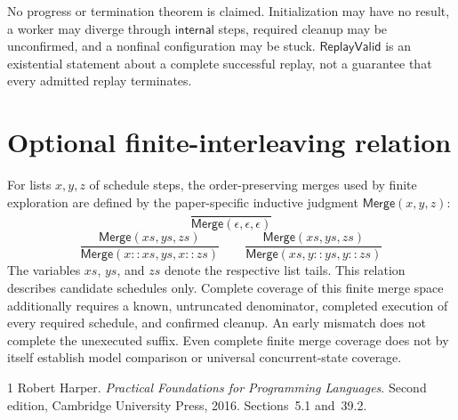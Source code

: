 \documentclass{article}
\newcommand{\Internal}{\mathsf{internal}}
\newcommand{\ReplayValid}{\mathsf{ReplayValid}}
\newcommand{\Merge}{\mathsf{Merge}}
\begin{document}
No progress or termination theorem is claimed. Initialization may have no
result, a worker may diverge through $\Internal$ steps, required cleanup may
be unconfirmed, and a nonfinal configuration may be stuck. $\ReplayValid$ is
an existential statement about a complete successful replay, not a guarantee
that every admitted replay terminates.

\section{Optional finite-interleaving relation}

For lists $x,y,z$ of schedule steps, the order-preserving merges used by finite
exploration are defined by the paper-specific inductive judgment
$\Merge(x,y,z)$:
\[
\frac{}{\Merge(\epsilon,\epsilon,\epsilon)}
\]
\[
\frac{\Merge(xs,ys,zs)}
     {\Merge(x::xs,ys,x::zs)}
\qquad
\frac{\Merge(xs,ys,zs)}
     {\Merge(xs,y::ys,y::zs)}
\]
The variables $xs$, $ys$, and $zs$ denote the respective list tails. This
relation describes candidate schedules only. Complete coverage of this finite
merge space additionally requires a known, untruncated denominator, completed
execution of every required schedule, and confirmed cleanup. An early mismatch
does not complete the unexecuted suffix. Even complete finite merge coverage
does not by itself establish model comparison or universal concurrent-state
coverage.

\begin{thebibliography}{1}
Robert Harper.
\emph{Practical Foundations for Programming Languages}.
Second edition, Cambridge University Press, 2016.
Sections~5.1 and~39.2.
\end{thebibliography}
\end{document}
